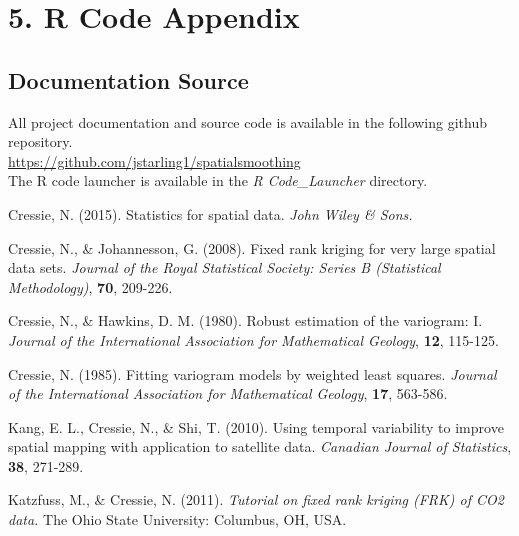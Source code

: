 \documentclass[11pt]{article}
\newcommand{\myindent}{\hspace*{1cm}}
\begin{document}
\newpage
\section{5. R Code Appendix}

\subsection{Documentation Source}
All project documentation and source code is available in the following github repository.\\

\myindent \url{https://github.com/jstarling1/spatialsmoothing}\\

The R code launcher is available in the \textit{R Code\_Launcher} directory.\\

\small
\begin{thebibliography}{50}

 Cressie, N. (2015). Statistics for spatial data. \textit{John Wiley \& Sons.}

 Cressie, N., \& Johannesson, G. (2008). Fixed rank kriging for very large spatial data sets. \textit{Journal of the Royal Statistical Society: Series B (Statistical Methodology)}, \textbf{70}, 209-226.

 Cressie, N., \& Hawkins, D. M. (1980). Robust estimation of the variogram: I. \textit{Journal of the International Association for Mathematical Geology}, \textbf{12}, 115-125.

 Cressie, N. (1985). Fitting variogram models by weighted least squares. \textit{Journal of the International Association for Mathematical Geology}, \textbf{17}, 563-586.

 Kang, E. L., Cressie, N., \& Shi, T. (2010). Using temporal variability to improve spatial mapping with application to satellite data. \textit{Canadian Journal of Statistics}, \textbf{38}, 271-289.

 Katzfuss, M., \& Cressie, N. (2011). \textit{Tutorial on fixed rank kriging (FRK) of CO2 data.} The Ohio State University: Columbus, OH, USA.


\end{thebibliography}
\end{document}
